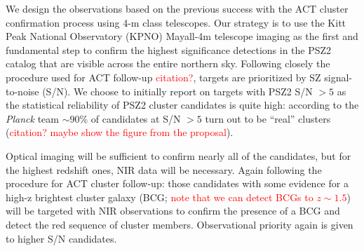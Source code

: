 \documentclass[apj, revtex4]{emulateapj}
\newcommand{\editorial}[1]{\textcolor{red}{#1}}
\begin{document}
We design the observations based on the previous success with the ACT cluster confirmation process using 4-m class telescopes. Our strategy is to use the Kitt Peak National Observatory (KPNO) Mayall-4m telescope imaging as the first and fundamental step to confirm the highest significance detections in the PSZ2 catalog that are visible across the entire northern sky. Following closely the procedure used for ACT follow-up \editorial{citation?}, targets are prioritized by SZ signal-to-noise (S/N). We choose to initially report on targets with PSZ2 S/N $>5$ as the statistical reliability of PSZ2 cluster candidates is quite high: according to the \textit{Planck} team $\sim90$\% of candidates at S/N $>5$ turn out to be ``real'' clusters (\editorial{citation? maybe show the figure from the proposal}).

Optical imaging will be sufficient to confirm nearly all of the candidates, but for the highest redshift ones, NIR data will be necessary. Again following the procedure for ACT cluster follow-up: those candidates with some evidence for a high-z brightest cluster galaxy (BCG; \editorial{note that we can detect BCGs to $z \sim 1.5$}) will be targeted with NIR observations to confirm the presence of a BCG and detect the red sequence of cluster members. Observational priority again is given to higher S/N candidates.

\end{document}
